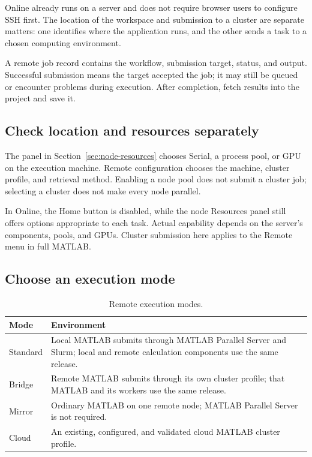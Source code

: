 Online already runs on a server and does not require browser users to configure SSH first. The location of the workspace and submission to a cluster are separate matters: one identifies where the application runs, and the other sends a task to a chosen computing environment.

A remote job record contains the workflow, submission target, status, and output. Successful submission means the target accepted the job; it may still be queued or encounter problems during execution. After completion, fetch results into the project and save it.

\subsection{Check location and resources separately}

The  panel in Section~\ref{sec:node-resources} chooses Serial, a process pool, or GPU on the execution machine. Remote configuration chooses the machine, cluster profile, and retrieval method. Enabling a node pool does not submit a cluster job; selecting a cluster does not make every node parallel.

In Online, the Home  button is disabled, while the node Resources panel still offers options appropriate to each task. Actual capability depends on the server's components, pools, and GPUs. Cluster submission here applies to the Remote menu in full MATLAB\regmark{}.

\subsection{Choose an execution mode}

\begin{table}[htbp]
\centering
\caption{Remote execution modes.}
\begin{tabularx}{\linewidth}{lX}
\toprule
Mode & Environment \\
\midrule
Standard & Local MATLAB\regmark{} submits through MATLAB\regmark{} Parallel Server and Slurm; local and remote calculation components use the same release.\\
Bridge & Remote MATLAB\regmark{} submits through its own cluster profile; that MATLAB\regmark{} and its workers use the same release.\\
Mirror & Ordinary MATLAB\regmark{} on one remote node; MATLAB\regmark{} Parallel Server is not required.\\
Cloud & An existing, configured, and validated cloud MATLAB\regmark{} cluster profile.\\
\bottomrule
\end{tabularx}
\end{table}

